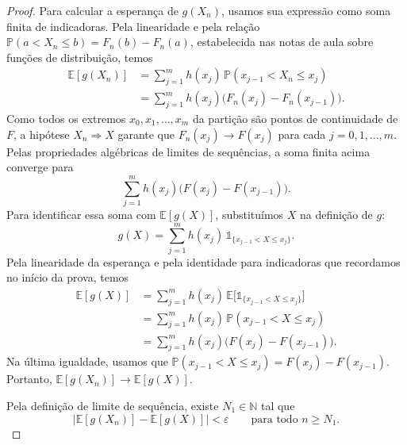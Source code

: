 \documentclass[12pt,portuguese]{article}
\theoremstyle{definition}
\theoremstyle{plainexercise}
\theoremstyle{starredexercise}
\theoremstyle{definition}
\begin{document}
\begin{proof}
Para calcular a esperança de $g(X_n)$, usamos sua expressão como soma finita
de indicadoras. Pela linearidade e pela relação
$\mathbb{P}(a<X_n\leqslant b)=F_n(b)-F_n(a)$, estabelecida nas notas de aula
sobre funções de distribuição, temos
\begin{align*}
\mathbb{E}[g(X_n)]
&=\sum_{j=1}^{m}h(x_j)\,
\mathbb{P}(x_{j-1}<X_n\leqslant x_j)\\[0.3cm]
&=\sum_{j=1}^{m}h(x_j)\bigl(F_n(x_j)-F_n(x_{j-1})\bigr).
\end{align*}
Como todos os extremos $x_0,x_1,\ldots,x_m$ da partição são pontos de
continuidade de $F$, a hipótese $X_n\Rightarrow X$ garante que
$F_n(x_j)\to F(x_j)$ para cada $j=0,1,\ldots,m$. Pelas propriedades algébricas
de limites de sequências, a soma finita acima converge para
\[
\sum_{j=1}^{m}h(x_j)\bigl(F(x_j)-F(x_{j-1})\bigr).
\]
Para identificar essa soma com $\mathbb{E}[g(X)]$, substituímos $X$ na
definição de $g$:
\[
g(X)=\sum_{j=1}^{m}h(x_j)\,
\mathds{1}_{\{x_{j-1}<X\leqslant x_j\}}.
\]
Pela linearidade da esperança e pela identidade para indicadoras que
recordamos no início da prova, temos
\begin{align*}
\mathbb{E}[g(X)]
&=\sum_{j=1}^{m}h(x_j)\,
\mathbb{E}\bigl[\mathds{1}_{\{x_{j-1}<X\leqslant x_j\}}\bigr]\\[0.3cm]
&=\sum_{j=1}^{m}h(x_j)\,
\mathbb{P}(x_{j-1}<X\leqslant x_j)\\[0.3cm]
&=\sum_{j=1}^{m}h(x_j)\bigl(F(x_j)-F(x_{j-1})\bigr).
\end{align*}
Na última igualdade, usamos que
$\mathbb{P}(x_{j-1}<X\leqslant x_j)=F(x_j)-F(x_{j-1})$.
Portanto, $\mathbb{E}[g(X_n)]\to\mathbb{E}[g(X)]$.

Pela definição de limite de sequência, existe $N_1\in\mathbb{N}$ tal que
\begin{equation}\label{eq:erro-g-Xn-X}
\bigl|\mathbb{E}[g(X_n)]-\mathbb{E}[g(X)]\bigr|<\varepsilon
\qquad\text{para todo }n\geqslant N_1.
\end{equation}


\end{proof}
\end{document}
